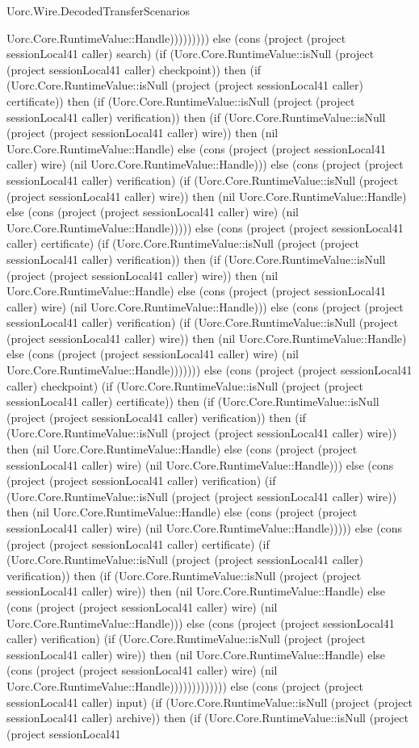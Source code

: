 \begin{lexlean}{Uorc.Wire.DecodedTransferScenarios}
\begin{semanticmodule}
{Uorc.Core.RuntimeValue::Handle))))))))) else (cons (project (project sessionLocal41 caller) search) (if (Uorc.Core.RuntimeValue::isNull (project (project sessionLocal41 caller) checkpoint)) then (if (Uorc.Core.RuntimeValue::isNull (project (project sessionLocal41 caller) certificate)) then (if (Uorc.Core.RuntimeValue::isNull (project (project sessionLocal41 caller) verification)) then (if (Uorc.Core.RuntimeValue::isNull (project (project sessionLocal41 caller) wire)) then (nil Uorc.Core.RuntimeValue::Handle) else (cons (project (project sessionLocal41 caller) wire) (nil Uorc.Core.RuntimeValue::Handle))) else (cons (project (project sessionLocal41 caller) verification) (if (Uorc.Core.RuntimeValue::isNull (project (project sessionLocal41 caller) wire)) then (nil Uorc.Core.RuntimeValue::Handle) else (cons (project (project sessionLocal41 caller) wire) (nil Uorc.Core.RuntimeValue::Handle))))) else (cons (project (project sessionLocal41 caller) certificate) (if (Uorc.Core.RuntimeValue::isNull (project (project sessionLocal41 caller) verification)) then (if (Uorc.Core.RuntimeValue::isNull (project (project sessionLocal41 caller) wire)) then (nil Uorc.Core.RuntimeValue::Handle) else (cons (project (project sessionLocal41 caller) wire) (nil Uorc.Core.RuntimeValue::Handle))) else (cons (project (project sessionLocal41 caller) verification) (if (Uorc.Core.RuntimeValue::isNull (project (project sessionLocal41 caller) wire)) then (nil Uorc.Core.RuntimeValue::Handle) else (cons (project (project sessionLocal41 caller) wire) (nil Uorc.Core.RuntimeValue::Handle))))))) else (cons (project (project sessionLocal41 caller) checkpoint) (if (Uorc.Core.RuntimeValue::isNull (project (project sessionLocal41 caller) certificate)) then (if (Uorc.Core.RuntimeValue::isNull (project (project sessionLocal41 caller) verification)) then (if (Uorc.Core.RuntimeValue::isNull (project (project sessionLocal41 caller) wire)) then (nil Uorc.Core.RuntimeValue::Handle) else (cons (project (project sessionLocal41 caller) wire) (nil Uorc.Core.RuntimeValue::Handle))) else (cons (project (project sessionLocal41 caller) verification) (if (Uorc.Core.RuntimeValue::isNull (project (project sessionLocal41 caller) wire)) then (nil Uorc.Core.RuntimeValue::Handle) else (cons (project (project sessionLocal41 caller) wire) (nil Uorc.Core.RuntimeValue::Handle))))) else (cons (project (project sessionLocal41 caller) certificate) (if (Uorc.Core.RuntimeValue::isNull (project (project sessionLocal41 caller) verification)) then (if (Uorc.Core.RuntimeValue::isNull (project (project sessionLocal41 caller) wire)) then (nil Uorc.Core.RuntimeValue::Handle) else (cons (project (project sessionLocal41 caller) wire) (nil Uorc.Core.RuntimeValue::Handle))) else (cons (project (project sessionLocal41 caller) verification) (if (Uorc.Core.RuntimeValue::isNull (project (project sessionLocal41 caller) wire)) then (nil Uorc.Core.RuntimeValue::Handle) else (cons (project (project sessionLocal41 caller) wire) (nil Uorc.Core.RuntimeValue::Handle))))))))))))) else (cons (project (project sessionLocal41 caller) input) (if (Uorc.Core.RuntimeValue::isNull (project (project sessionLocal41 caller) archive)) then (if (Uorc.Core.RuntimeValue::isNull (project (project sessionLocal41 }
\end{semanticmodule}
\end{lexlean}
